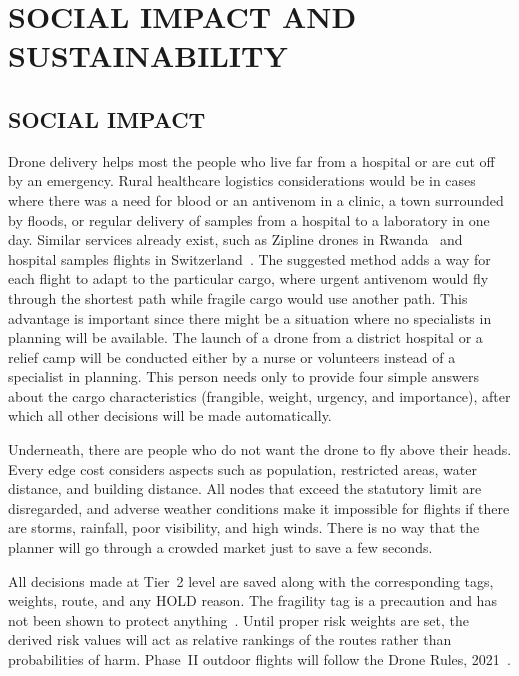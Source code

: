 
\chapter{SOCIAL IMPACT AND SUSTAINABILITY}\label{cha:social}

\section{SOCIAL IMPACT}

Drone delivery helps most the people who live far from a hospital or are cut off by an
emergency. Rural healthcare logistics considerations would be in cases where there was a
need for blood or an antivenom in a clinic, a town surrounded by floods, or regular
delivery of samples from a hospital to a laboratory in one day. Similar services already exist, such as Zipline drones in Rwanda~\cite{r16} and hospital samples flights in Switzerland~\cite{r12}. The suggested method adds a way for
each flight to adapt to the particular cargo, where urgent antivenom would fly through
the shortest path while fragile cargo would use another path. This advantage is important since there might be a situation where no specialists in
planning will be available. The launch of a drone from a district hospital or a relief
camp will be conducted either by a nurse or volunteers instead of a specialist in
planning. This person needs only to provide four simple answers about the cargo
characteristics (frangible, weight, urgency, and importance), after which all other
decisions will be made automatically.

Underneath, there are people who do not want the drone to fly above their heads. Every
edge cost considers aspects such as population, restricted areas, water distance, and
building distance. All nodes that exceed the statutory limit are disregarded, and
adverse weather conditions make it impossible for flights if there are storms, rainfall,
poor visibility, and high winds. There is no way that the planner will go through a
crowded market just to save a few seconds.

All decisions made at Tier~2 level are saved along with the corresponding tags, weights,
route, and any HOLD reason. The fragility tag
is a precaution and has not been shown to protect anything~\cite{r13,r14,r15}. Until
proper risk weights are set, the derived risk values will act as relative rankings of
the routes rather than probabilities of harm. Phase~II outdoor flights will follow the
Drone Rules, 2021~\cite{r21}.

